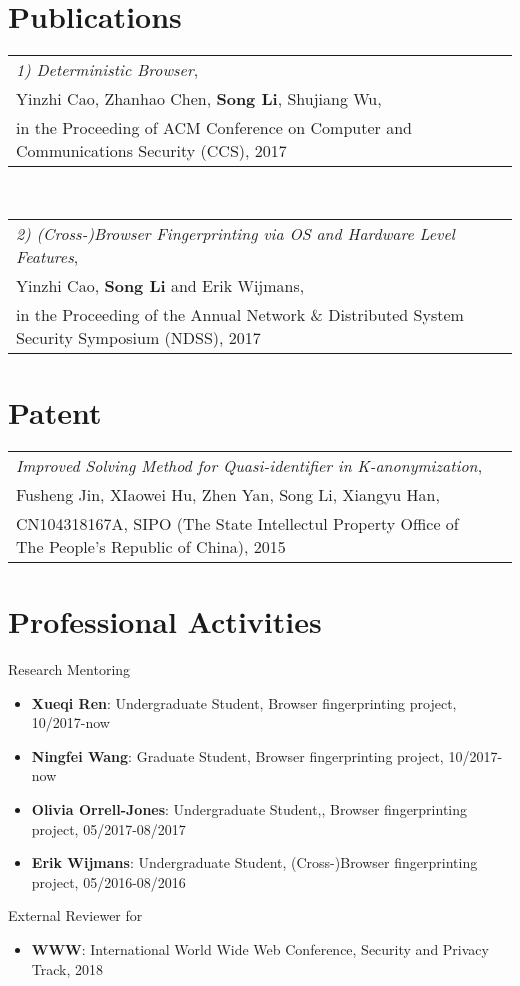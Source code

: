 \documentclass[letterpaper,11pt]{article}
\makeatletter
\newcommand{\resumeItem}[2]{
  \item\small{
    \textbf{#1}{: #2 \vspace{-2pt}}
  }
}
\newcommand{\resumeItemListStart}{\begin{itemize}}
\newcommand{\resumeItemListEnd}{\end{itemize}\vspace{-5pt}}
\newcommand{\publicationSubItem}[3]{
  \vspace{-1pt}
    \begin{tabular*}{0.97\textwidth}{l@{\extracolsep{\fill}}r}
      \textit{#1}, &  \\
      {\small#2}, & \\
      {\small #3}&\\
    \end{tabular*}\vspace{5pt}
}
\makeatother
\begin{document}
\section{Publications}
  \publicationSubItem{1) Deterministic Browser}
  {Yinzhi Cao, Zhanhao Chen, \textbf{Song Li}, Shujiang Wu}
{in the Proceeding of ACM Conference on Computer and Communications Security (CCS), 2017}
\\

\publicationSubItem{2) (Cross-)Browser Fingerprinting via OS and Hardware Level Features}
{Yinzhi Cao, \textbf{Song Li} and Erik Wijmans}
{in the Proceeding of the Annual Network \& Distributed System Security Symposium (NDSS), 2017}

\section{Patent}
\publicationSubItem{Improved Solving Method for Quasi-identifier in K-anonymization}{Fusheng Jin, XIaowei Hu, Zhen Yan, Song Li, Xiangyu Han}{CN104318167A, SIPO (The State Intellectul Property Office of The People's Republic of China), 2015}

\section{Professional Activities}
Research Mentoring
    \resumeItemListStart
		\resumeItem{Xueqi Ren}{Undergraduate Student, Browser fingerprinting project, 10/2017-now}    
		\resumeItem{Ningfei Wang}{Graduate Student, Browser fingerprinting project, 10/2017-now}
		\resumeItem{Olivia Orrell-Jones}{Undergraduate Student,, Browser fingerprinting project, 05/2017-08/2017}		
		\resumeItem{Erik Wijmans}{Undergraduate Student, (Cross-)Browser fingerprinting project, 05/2016-08/2016}
	\resumeItemListEnd
External Reviewer for 
    \resumeItemListStart
		\resumeItem{WWW}{International World Wide Web Conference, Security and Privacy Track, 2018}    
	\resumeItemListEnd	
\end{document}

